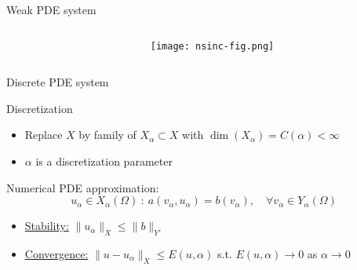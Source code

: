 \begin{frame}{Weak PDE system}
\begin{columns}
\begin{column}{0.65\textwidth}
\begin{overprint}

      \end{overprint}

    \end{column}
    \begin{column}{0.35\textwidth}

          \texttt{[image: nsinc-fig.png]}

    \end{column}

  \end{columns}

\end{frame}



\begin{frame}{Discrete PDE system}

  \begin{block}{Discretization}

    \begin{itemize}

      \item Replace $X$ by family of $X_\alpha \subset X$ with $\dim(X_\alpha) = C(\alpha) < \infty$

      \item $\alpha$ is a discretization parameter



    \end{itemize}

  \end{block}

Numerical PDE approximation:
$$
u_\alpha \in X_\alpha(\Omega) \ : \ a(v_\alpha,u_\alpha) = b(v_\alpha), \quad \forall v_\alpha \in Y_\alpha(\Omega)
$$

\begin{itemize}
  \item \underline{Stability:} $\| u_\alpha \|_{X} \leq \| b \|_{Y'}$%
  \item \underline{Convergence:} $\| u - u_\alpha \|_{X} \leq E(u,\alpha)$ s.t. $E(u,\alpha) \to 0$ as $\alpha \to 0$
\end{itemize}

%
\end{frame}


